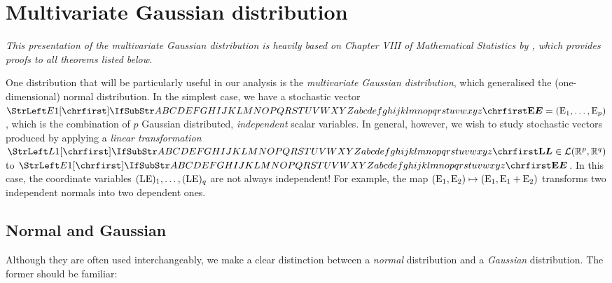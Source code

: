 \documentclass[main.tex]{subfiles}
\begin{document}

\section{Multivariate Gaussian distribution}
\emph{This presentation of the multivariate Gaussian distribution is heavily based on Chapter VIII of \emph{Mathematical Statistics} by \cite{Pestman1998}, which provides proofs to all theorems listed below.}

One distribution that will be particularly useful in our analysis is the \emph{multivariate Gaussian distribution}, which generalised the (one-dimensional) normal distribution. In the simplest case, we have a stochastic vector $\mat{E}=(\mel{E}_1, \dots, \mel{E}_p)$, which is the combination of $p$ Gaussian distributed, \emph{independent} scalar variables. In general, however, we wish to study stochastic vectors produced by applying a \emph{linear transformation} $\mat{L} \in \mathcal{L}(\mathbb{R}^p, \mathbb{R}^q)$ to $\mat{E}$. In this case, the coordinate variables $({\mathrm{LE}})_1,\dots,({\mathrm{LE}})_q$ are not always independent! For example, the map $({\mathrm{E}}_1, {\mathrm{E}}_2) \mapsto ({\mathrm{E}}_1, {\mathrm{E}}_1 + {\mathrm{E}}_2)$ transforms two independent normals into two dependent ones.
\subsection{Normal and Gaussian}
Although they are often used interchangeably, we make a clear distinction between a \emph{normal} distribution and a \emph{Gaussian} distribution. The former should be familiar:
\end{document}
